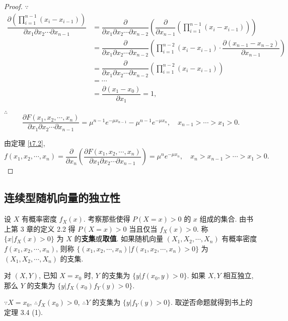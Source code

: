 \documentclass{ctexart}
\begin{document}
\begin{proof}
    $\because$
    \begin{align*}
        \dfrac{\partial\left(\prod\limits_{i=1}^{n-1}(x_i-x_{i-1})\right)}{\partial x_1\partial x_2\cdots\partial x_{n-1}} & =\dfrac{\partial}{\partial x_1\partial x_2\cdots\partial x_{n-2}}\left(\dfrac{\partial}{\partial x_{n-1}}\left(\prod\limits_{i=1}^{n-1}(x_i-x_{i-1})\right)\right) \\
        & =\dfrac{\partial}{\partial x_1\partial x_2\cdots\partial x_{n-2}}\left(\prod\limits_{i=1}^{n-2}(x_i-x_{i-1})\cdot\dfrac{\partial(x_{n-1}-x_{n-2})}{\partial x_{n-1}}\right) \\
        & =\dfrac{\partial}{\partial x_1\partial x_2\cdots\partial x_{n-2}}\left(\prod\limits_{i=1}^{n-2}(x_i-x_{i-1})\right) \\
        & =\cdots \\
        & =\dfrac{\partial(x_1-x_0)}{\partial x_1}=1,
    \end{align*}

    $\therefore$
    \[\dfrac{\partial F(x_1,x_2,\cdots,x_n)}{\partial x_1\partial x_2\cdots\partial x_{n-1}}=\mu^{n-1}e^{-\mu x_{n-1}}-\mu^{n-1}e^{-\mu x_n},\quad x_{n-1}>\cdots>x_1>0.\]

    由定理 \ref{t7.2},
    \[f(x_1,x_2,\cdots,x_n)=\dfrac{\partial}{\partial x_n}\left(\dfrac{\partial F(x_1,x_2,\cdots,x_n)}{\partial x_1\partial x_2\cdots\partial x_{n-1}}\right)=\mu^ne^{-\mu x_n},\quad x_n>x_{n-1}>\cdots>x_1>0.\]
\end{proof}
\subsection{连续型随机向量的独立性}
设 $X$ 有概率密度 $f_X(x)$. 考察那些使得 $P(X=x)>0$ 的 $x$ 组成的集合. 由书上第 3 章的定义 2.2 得 $P(X=x)>0$ 当且仅当 $f_X(x)>0$. 称 $\{x|f_X(x)>0\}$ 为 $X$ 的\textbf{支集}或\textbf{取值}. 如果随机向量 $(X_1,X_2,\cdots,X_n)$ 有概率密度 $f(x_1,x_2,\cdots,x_n)$, 则称 $\{(x_1,x_2,\cdots,x_n)|f(x_1,x_2,\cdots,x_n)>0\}$ 为 $(X_1,X_2,\cdots,X_n)$ 的支集.

对 $(X,Y)$, 已知 $X=x_0$ 时, $Y$ 的支集为 $\{y|f(x_0,y)>0\}$. 如果 $X,Y$ 相互独立, 那么 $Y$ 的支集为 $\{y|f_X(x_0)f_Y(y)>0\}$.

$\because X=x_0$, $\therefore f_X(x_0)>0$, $\therefore Y$ 的支集为 $\{y|f_Y(y)>0\}$. 取逆否命题就得到书上的定理 3.4 (1).
\end{document}
